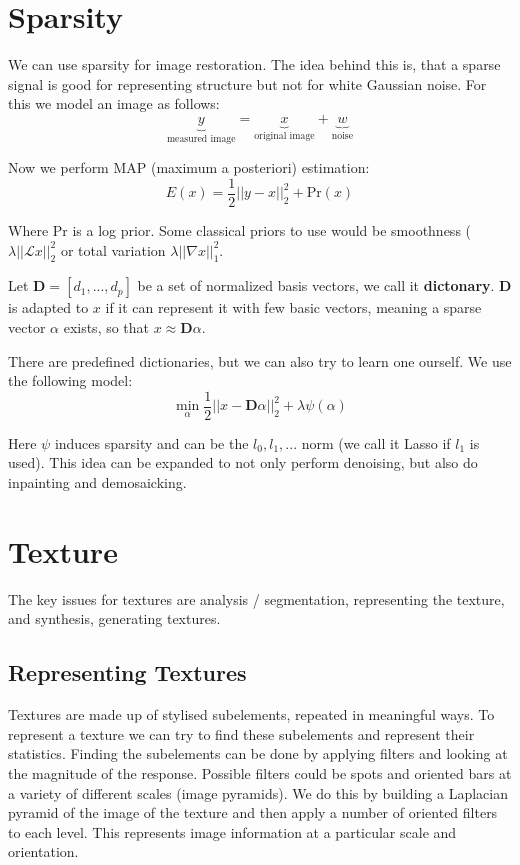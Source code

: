 \section{Sparsity}

We can use sparsity for image restoration. The idea behind this is, that a sparse signal is good for representing structure but not for white Gaussian noise. For this we model an image as follows:
$$\underbrace{y}_{\text{measured image}} = \underbrace{x}_{\text{original image}} + \underbrace{w}_{\text{noise}}$$

Now we perform MAP (maximum a posteriori) estimation:
$$E(x) = \frac{1}{2} ||y-x||_2^2 + \text{Pr}(x)$$

Where Pr is a log prior. Some classical priors to use would be smoothness ($\lambda || \mathcal L x||_2^2$ or total variation $\lambda ||\nabla x ||_1^2$. \medskip

Let $\mathbf D = [d_1, ..., d_p]$ be a set of normalized basis vectors, we call it \textbf{dictonary}. $\mathbf D$ is adapted to $x$ if it can represent it with few basic vectors, meaning a sparse vector $\alpha$ exists, so that $x \approx \mathbf D \alpha$. \medskip

There are predefined dictionaries, but we can also try to learn one ourself. We use the following model:
$$\min_{\alpha} \frac{1}{2} ||x - \mathbf D \alpha||_2^2 + \lambda \psi (\alpha)$$

Here $\psi$ induces sparsity and can be the $l_0, l_1, ...$ norm (we call it Lasso if $l_1$ is used). This idea can be expanded to not only perform denoising, but also do inpainting and demosaicking.


\section{Texture}

The key issues for textures are analysis / segmentation, representing the texture, and synthesis, generating textures.

\subsection{Representing Textures}

Textures are made up of stylised subelements, repeated in meaningful ways. To represent a texture we can try to find these subelements and represent their statistics. Finding the subelements can be done by applying filters and looking at the magnitude of the response. Possible filters could be spots and oriented bars at a variety of different scales (image pyramids). We do this by building a Laplacian pyramid of the image of the texture and then apply a number of oriented filters to each level. This represents image information at a particular scale and orientation.

